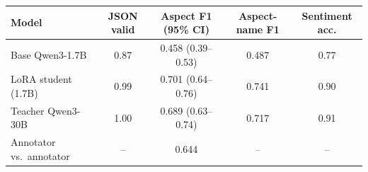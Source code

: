 \begin{tabular}{lcccc}
\toprule
Model & JSON valid & Aspect F1 (95\% CI) & Aspect-name F1 & Sentiment acc. \\
\midrule
Base Qwen3-1.7B & 0.87 & 0.458 (0.39--0.53) & 0.487 & 0.77 \\
LoRA student (1.7B) & 0.99 & 0.701 (0.64--0.76) & 0.741 & 0.90 \\
Teacher Qwen3-30B & 1.00 & 0.689 (0.63--0.74) & 0.717 & 0.91 \\
\midrule
Annotator vs.\ annotator & -- & 0.644 & -- & -- \\
\bottomrule
\end{tabular}
